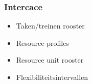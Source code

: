 \begin{frame}\frametitle{Intercace}
\begin{itemize}
    \item Taken/treinen rooster
    \item Resource profiles
    \item Resource unit rooster
    \item Flexibiliteitsintervallen
\end{itemize}
\end{frame}
